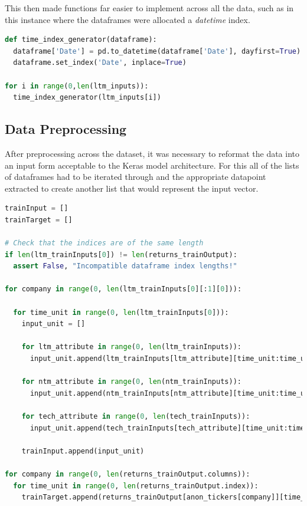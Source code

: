 \documentclass[10pt,onecolumn,letterpaper]{article}
\begin{document}
This then made functions far easier to implement across all the data, such as in this instance where the dataframes were allocated a \textit{datetime} index. 

\begin{lstlisting}[language=Python, breaklines=true]
def time_index_generator(dataframe):
  dataframe['Date'] = pd.to_datetime(dataframe['Date'], dayfirst=True)
  dataframe.set_index('Date', inplace=True)

for i in range(0,len(ltm_inputs)):
  time_index_generator(ltm_inputs[i])
\end{lstlisting} 

\subsection{Data Preprocessing}

After preprocessing across the dataset, it was necessary to reformat the data into an input form acceptable to the Keras model architecture. For this all of the lists of dataframes had to be iterated through and the appropriate datapoint extracted to create another list that would represent the input vector. 

\begin{lstlisting}[language=Python, breaklines=true]
trainInput = []
trainTarget = []

# Check that the indices are of the same length 
if len(ltm_trainInputs[0]) != len(returns_trainOutput):
  assert False, "Incompatible dataframe index lengths!"

for company in range(0, len(ltm_trainInputs[0][:1][0])):
  
  for time_unit in range(0, len(ltm_trainInputs[0])): 
    input_unit = []
    
    for ltm_attribute in range(0, len(ltm_trainInputs)): 
      input_unit.append(ltm_trainInputs[ltm_attribute][time_unit:time_unit+1][0][company])
                        
    for ntm_attribute in range(0, len(ntm_trainInputs)):
      input_unit.append(ntm_trainInputs[ntm_attribute][time_unit:time_unit+1][0][company])
                        
    for tech_attribute in range(0, len(tech_trainInputs)): 
      input_unit.append(tech_trainInputs[tech_attribute][time_unit:time_unit+1][0][company])
                        
    trainInput.append(input_unit)
    
for company in range(0, len(returns_trainOutput.columns)):
  for time_unit in range(0, len(returns_trainOutput.index)): 
    trainTarget.append(returns_trainOutput[anon_tickers[company]][time_unit])
\end{lstlisting} 
\end{document}
